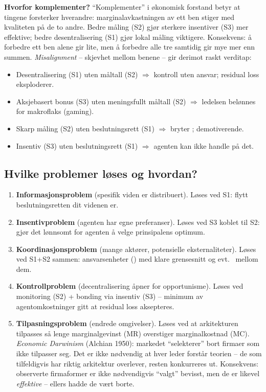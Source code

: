 \textbf{Hvorfor komplementer?} ``Komplementer'' i økonomisk forstand betyr at tingene forsterker hverandre: marginalavkastningen av ett ben stiger med kvaliteten på de to andre. Bedre måling (S2) gjør sterkere insentiver (S3) mer effektive; bedre desentralisering (S1) gjør lokal måling viktigere. Konsekvens: å forbedre ett ben alene gir lite, men å forbedre alle tre samtidig gir mye mer enn summen. \emph{Misalignment} -- skjevhet mellom benene -- gir derimot raskt verditap:
\begin{itemize}\setlength{\itemsep}{2pt}
\item Desentralisering (S1) uten måltall (S2) $\Rightarrow$ kontroll uten ansvar; residual loss eksploderer.
\item Aksjebasert bonus (S3) uten meningsfullt måltall (S2) $\Rightarrow$ ledelsen belønnes for makroflaks (gaming).
\item Skarp måling (S2) uten beslutningsrett (S1) $\Rightarrow$ bryter ; demotiverende.
\item Insentiv (S3) uten beslutningsrett (S1) $\Rightarrow$ agenten kan ikke handle på det.
\end{itemize}

\subsection*{Hvilke problemer løses og hvordan?}
\begin{enumerate}\setlength{\itemsep}{2pt}
\item \textbf{Informasjonsproblem} (spesifik viden er distribuert). Løses ved S1: flytt beslutningsretten dit videnen er.
\item \textbf{Insentivproblem} (agenten har egne preferanser). Løses ved S3 koblet til S2: gjør det lønnsomt for agenten å velge prinsipalens optimum.
\item \textbf{Koordinasjonsproblem} (mange aktører, potensielle eksternaliteter). Løses ved S1+S2 sammen: ansvarsenheter () med klare grensesnitt og evt.\  mellom dem.
\item \textbf{Kontrollproblem} (decentralisering åpner for opportunisme). Løses ved monitoring (S2) + bonding via insentiv (S3) -- minimum av agentomkostninger gitt at residual loss aksepteres.
\item \textbf{Tilpasningsproblem} (endrede omgivelser). Løses ved at arkitekturen tilpasses så lenge marginalgevinst (MR) overstiger marginalkostnad (MC). \emph{Economic Darwinism} (Alchian 1950): markedet ``selekterer'' bort firmaer som ikke tilpasser seg. Det er ikke nødvendig at hver leder forstår teorien -- de som tilfeldigvis har riktig arkitektur overlever, resten konkurreres ut. Konsekvens: observerte firmaformer er ikke nødvendigvis ``valgt'' bevisst, men de er likevel \emph{effektive} -- ellers hadde de vært borte.
\end{enumerate}

